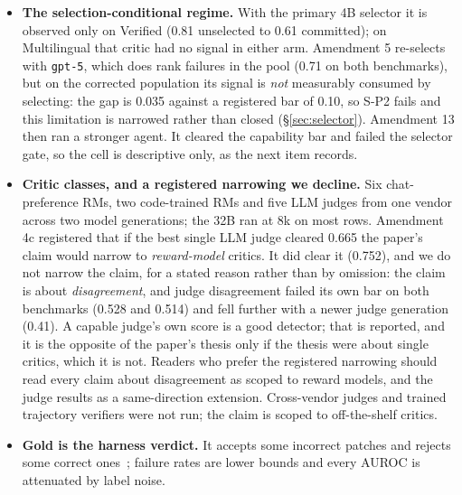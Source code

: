 \documentclass[11pt]{article}
\begin{document}
\begin{itemize}[leftmargin=1.2em,itemsep=1pt]
\item \textbf{The selection-conditional regime.} With the primary 4B selector it is observed only on Verified (0.81 unselected to 0.61 committed); on Multilingual that critic had no signal in either arm. Amendment 5 re-selects with \texttt{gpt-5}, which does rank failures in the pool (0.71 on both benchmarks), but on the corrected population its signal is \emph{not} measurably consumed by selecting: the gap is 0.035 against a registered bar of 0.10, so S-P2 fails and this limitation is narrowed rather than closed (\S\ref{sec:selector}). Amendment 13 then ran a stronger agent. It cleared the capability bar and failed the selector gate, so the cell is descriptive only, as the next item records.
\item \textbf{Critic classes, and a registered narrowing we decline.} Six chat-preference RMs, two code-trained RMs and five LLM judges from one vendor across two model generations; the 32B ran at 8k on most rows. Amendment 4c registered that if the best single LLM judge cleared 0.665 the paper's claim would narrow to \emph{reward-model} critics. It did clear it (0.752), and we do not narrow the claim, for a stated reason rather than by omission: the claim is about \emph{disagreement}, and judge disagreement failed its own bar on both benchmarks (0.528 and 0.514) and fell further with a newer judge generation (0.41). A capable judge's own score is a good detector; that is reported, and it is the opposite of the paper's thesis only if the thesis were about single critics, which it is not. Readers who prefer the registered narrowing should read every claim about disagreement as scoped to reward models, and the judge results as a same-direction extension. Cross-vendor judges and trained trajectory verifiers were not run; the claim is scoped to off-the-shelf critics.
\item \textbf{Gold is the harness verdict.} It accepts some incorrect patches and rejects some correct ones~\citep{wang2025solved,rajan2026auditing,agentlens2026}; failure rates are lower bounds and every AUROC is attenuated by label noise.

\end{itemize}
\end{document}
